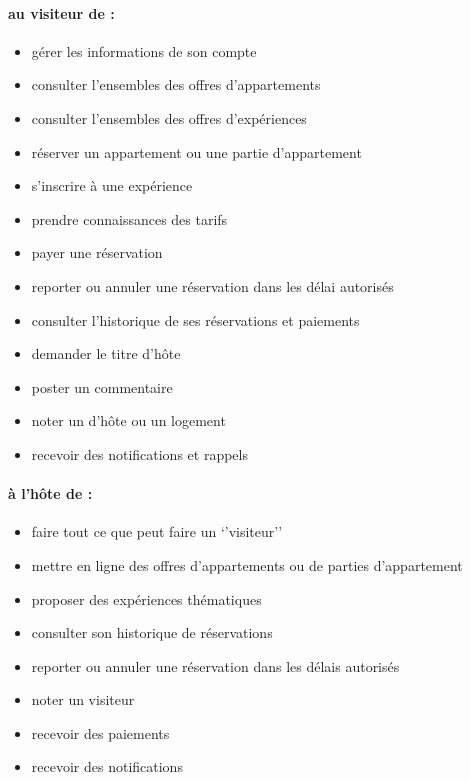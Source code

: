 \paragraph{au visiteur de :}
\begin{itemize}
\item[\textbullet] gérer les informations de son compte
\item[\textbullet] consulter l’ensembles des offres d’appartements
\item[\textbullet] consulter l’ensembles des offres d'expériences
\item[\textbullet] réserver un appartement ou une partie d’appartement
\item[\textbullet] s’inscrire à une expérience
\item[\textbullet] prendre connaissances des tarifs
\item[\textbullet] payer une réservation
\item[\textbullet] reporter ou annuler une réservation dans les délai autorisés
\item[\textbullet] consulter l’historique de ses réservations et paiements
\item[\textbullet] demander le titre d’hôte
\item[\textbullet] poster un commentaire
\item[\textbullet] noter un d’hôte ou un logement
\item[\textbullet] recevoir des notifications et rappels
\end{itemize}


\paragraph{à l'hôte de :}
\begin{itemize}
\item[\textbullet] faire tout ce que peut faire un ‘’visiteur’’
\item[\textbullet] mettre en ligne des offres d’appartements ou de parties d’appartement
\item[\textbullet] proposer des expériences thématiques
\item[\textbullet] consulter son historique de réservations
\item[\textbullet] reporter ou annuler une réservation dans les délais autorisés
\item[\textbullet] noter un visiteur
\item[\textbullet] recevoir des paiements
\item[\textbullet] recevoir des notifications
\end{itemize} 

